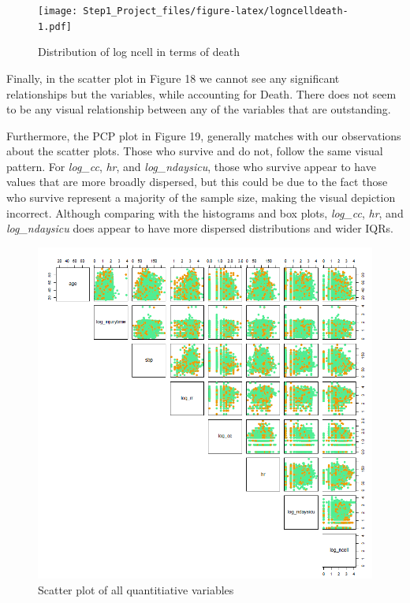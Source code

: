 \documentclass[
]{article}
\begin{document}
\begin{figure}
\centering
\texttt{[image: Step1\_Project\_files/figure-latex/logncelldeath-1.pdf]}
\caption{Distribution of log ncell in terms of
death\label{fig:logncelldeath}}
\end{figure}

Finally, in the scatter plot in Figure 18 we cannot see any significant
relationships but the variables, while accounting for Death. There does
not seem to be any visual relationship between any of the variables that
are outstanding.

Furthermore, the PCP plot in Figure 19, generally matches with our
observations about the scatter plots. Those who survive and do not,
follow the same visual pattern. For \emph{log\_cc}, \emph{hr}, and
\emph{log\_ndaysicu}, those who survive appear to have values that are
more broadly dispersed, but this could be due to the fact those who
survive represent a majority of the sample size, making the visual
depiction incorrect. Although comparing with the histograms and box
plots, \emph{log\_cc}, \emph{hr}, and \emph{log\_ndaysicu} does appear
to have more dispersed distributions and wider IQRs.

\newpage

\begin{figure}
\centering
\includegraphics{../figure_output/pairs_death.png}
\caption{Scatter plot of all quantitiative variables}
\end{figure}
\end{document}
